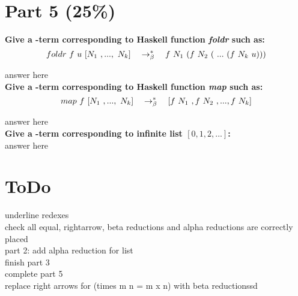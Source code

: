 \documentclass{article}
\begin{document}
	
	
	\section{Part 5 (25\%)}
	
	\begin{Large}
		\textbf{Give a \lamb -term corresponding to Haskell function \textit{foldr} such as:}\\
		
		\begin{equation*}
			foldr \ f \ u \ [N_1 \ ,..., \ N_k] \quad \rightarrow_\beta^*\quad f \ N_1\ (f \ N_2 \ ( \ ... \ (f \ N_k \ u)))
		\end{equation*}
		\newline
		
		answer here\\
		
		\textbf{Give a \lamb -term corresponding to Haskell function \textit{map} such as:}\\
		
		\begin{equation*}
			map \ f \ [N_1\ ,..., \ N_k] \equalsT [f \ N_1 \ , f \ N_2 \ ,...,f \ N_k]
		\end{equation*}
		\newline
		
		answer here\\
		
		\textbf{Give a \lamb -term corresponding to infinite list $[0,1,2,...]$:}\\
		
		answer here
	\end{Large}
	
	
	\newpage
	
	\section{ToDo}
	
	\begin{Large}
		underline redexes\\
		
		check all equal, rightarrow, beta reductions and alpha reductions are correctly placed\\
		
		part 2: add alpha reduction for list\\
		
		finish part 3\\
		
		complete part 5\\
		
		replace right arrows for (times m n = m x n) with beta reductionssd 
	\end{Large}
\end{document}
